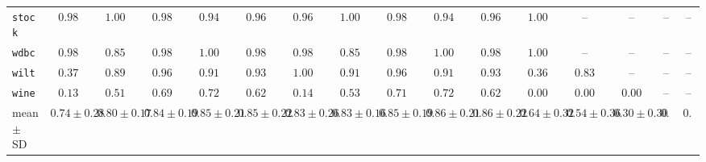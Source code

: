 {\begin{tabular}{@{}lccccccccccccccc@{}}
\texttt{stock} & $0.98$ & $1.00$ & $0.98$ & $0.94$ & $0.96$ & $0.96$ & $1.00$ & $0.98$ & $0.94$ & $0.96$ & $1.00$ & -- & -- & -- & -- \\
\texttt{wdbc} & $0.98$ & $0.85$ & $0.98$ & $1.00$ & $0.98$ & $0.98$ & $0.85$ & $0.98$ & $1.00$ & $0.98$ & $1.00$ & -- & -- & -- & -- \\
\texttt{wilt} & $0.37$ & $0.89$ & $0.96$ & $0.91$ & $0.93$ & $1.00$ & $0.91$ & $0.96$ & $0.91$ & $0.93$ & $0.36$ & $0.83$ & -- & -- & -- \\
\texttt{wine} & $0.13$ & $0.51$ & $0.69$ & $0.72$ & $0.62$ & $0.14$ & $0.53$ & $0.71$ & $0.72$ & $0.62$ & $0.00$ & $0.00$ & $0.00$ & -- & -- \\
\midrule mean $\pm$ SD & $0.74 \pm 0.28$ & $0.80 \pm 0.17$ & $0.84 \pm 0.19$ & $0.85 \pm 0.21$ & $0.85 \pm 0.22$ & $0.83 \pm 0.26$ & $0.83 \pm 0.16$ & $0.85 \pm 0.19$ & $0.86 \pm 0.21$ & $0.86 \pm 0.22$ & $0.64 \pm 0.32$ & $0.54 \pm 0.36$ & $0.30 \pm 0.30$ & $0.08$ & $0.00$ \\
\bottomrule\end{tabular}}
